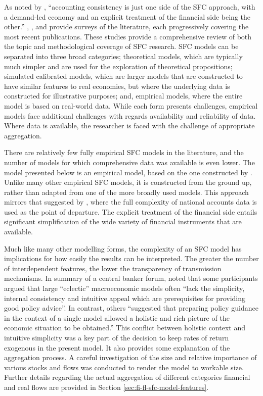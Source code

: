 \documentclass[
]{book}
\begin{document}
As noted by \citet[pp.~3]{nikiforoszezza2017}, ``accounting consistency is just one side of the SFC approach, with a demand-led economy and an explicit treatment of the financial side being the other.'' \citet{dossantos2006}, \citet{caverzasi2013}, \citet{caverzasigodin2015} and \citet{nikiforoszezza2017} provide surveys of the literature, each progressively covering the most recent publications. These studies provide a comprehensive review of both the topic and methodological coverage of SFC research. SFC models can be separated into three broad categories; theoretical models, which are typically much simpler and are used for the exploration of theoretical propositions; simulated calibrated models, which are larger models that are constructed to have similar features to real economies, but where the underlying data is constructed for illustrative purposes; and, empirical models, where the entire model is based on real-world data. While each form presents challenges, empirical models face additional challenges with regards availability and reliability of data. Where data is available, the researcher is faced with the challenge of appropriate aggregation.

There are relatively few fully empirical SFC models in the literature, and the number of models for which comprehensive data was available is even lower. The model presented below is an empirical model, based on the one constructed by \citet{byrialsenraza2019empirical}. Unlike many other empirical SFC models, it is constructed from the ground up, rather than adapted from one of the more broadly used \citet{godleylavoie2012} models. This approach mirrors that suggested by \citet{zezza2019design}, where the full complexity of national accounts data is used as the point of departure. The explicit treatment of the financial side entails significant simplification of the wide variety of financial instruments that are available.

Much like many other modelling forms, the complexity of an SFC model has implications for how easily the results can be interpreted. The greater the number of interdependent features, the lower the transparency of transmission mechanisms. In summary of a central banker forum, \citet[pp.~25]{Pill2001} noted that some participants argued that large ``eclectic'' macroeconomic models often ``lack the simplicity, internal consistency and intuitive appeal which are prerequisites for providing good policy advice''. In contrast, others ``suggested that preparing policy guidance in the context of a single model allowed a holistic and rich picture of the economic situation to be obtained.'' This conflict between holistic context and intuitive simplicity was a key part of the decision to keep rates of return exogenous in the present model. It also provides some explanation of the aggregation process. A careful investigation of the size and relative importance of various stocks and flows was conducted to render the model to workable size. Further details regarding the actual aggregation of different categories financial and real flows are provided in Section \ref{sec:fi-fl-sfc-model-features}.
\end{document}
